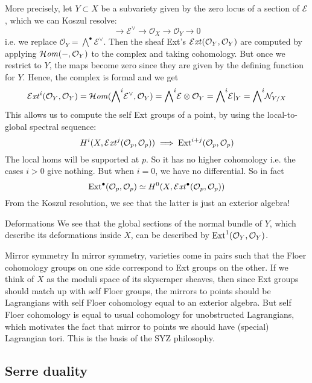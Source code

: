 More precisely, let $Y\subset X$ be a subvariety given by the zero locus of a section of $\mathcal{E}$, which we can Koszul resolve: $$\xrightarrow{}\mathcal{E}^\lor\xrightarrow{}\mathcal{O}_{X}\xrightarrow{}\mathcal{O}_{Y}\xrightarrow{}0$$i.e. we replace $\mathcal{O}_{Y}={\bigwedge}^\bullet \mathcal{E}^\lor$. Then the sheaf Ext's $\operatorname{\mathcal{E}\mathit{xt}}(\mathcal{O}_{Y},\mathcal{O}_{Y})$ are computed by applying $\operatorname{\mathcal{H}\mathit{om}}(-,\mathcal{O}_{Y})$ to the complex and taking cohomology. But once we restrict to $Y$, the maps become zero since they are given by the defining function for $Y$. Hence, the complex is formal and we get $$\operatorname{\mathcal{E}\mathit{xt}}^i(\mathcal{O}_{Y},\mathcal{O}_{Y})=\operatorname{\mathcal{H}\mathit{om}}({\bigwedge}^i \mathcal{E}^\lor, \mathcal{O}_{Y})={\bigwedge}^i \mathcal{E} \otimes \mathcal{O}_{Y}={\bigwedge}^i \mathcal{E}|_{Y}={\bigwedge}^i \mathcal{N}_{{Y/X}}$$ This allows us to compute the self Ext groups of a point, by using the local-to-global spectral sequence:$$H^i(X, \operatorname{\mathcal{E}\mathit{xt}}^j(\mathcal{O}_{p}, \mathcal{O}_{p}))\implies \mathrm{Ext}^{i+j}(\mathcal{O}_{p}, \mathcal{O}_{p})$$The local homs will be supported at $p$. So it has no higher cohomology i.e. the cases $i>0$ give nothing. But when $i=0$, we have no differential. So in fact $$\mathrm{Ext}^\bullet(\mathcal{O}_{p}, \mathcal{O}_{p})\simeq H^0(X, \operatorname{\mathcal{E}\mathit{xt}}^\bullet(\mathcal{O}_{p}, \mathcal{O}_{p}))$$
From the Koszul resolution, we see that the latter is just an exterior algebra!
\begin{remark}{Deformations}{}
    We see that the global sections of the normal bundle of $Y$, which describe its deformations inside $X$, can be described by $\operatorname{Ext}^1(\mathcal{O}_Y,\mathcal{O}_Y)$. 
\end{remark}
\begin{remark}{Mirror symmetry}{}
    In mirror symmetry, varieties come in pairs such that the Floer cohomology groups on one side correspond to Ext groups on the other. If we think of $X$ as the moduli space of its skyscraper sheaves, then since Ext groups should match up with self Floer groups, the mirrors to points should be Lagrangians with self Floer cohomology equal to an exterior algebra. But self Floer cohomology is equal to usual cohomology for unobstructed Lagrangians, which motivates the fact that mirror to points we should have (special) Lagrangian tori. This is the basis of the SYZ philosophy.
    
\end{remark}

\subsection{Serre duality}

